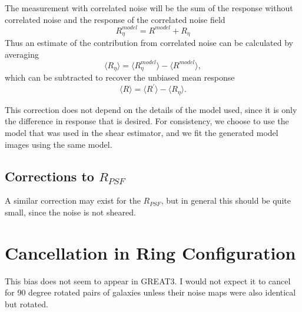 \documentclass[usegraphicx,usenatbib]{mn2e}
\begin{document}
The measurement with correlated noise will be the sum of the response
without correlated noise and the response of the correlated noise field
\begin{equation}
    R^{model}_\eta = R^{model} + R_\eta
\end{equation}
Thus an estimate of the contribution from correlated noise can
be calculated by averaging 
\begin{equation}
    \langle R_\eta \rangle = \langle R^{model}_\eta \rangle - \langle R^{model} \rangle,
\end{equation}
which can be subtracted to recover the unbiased mean response
\begin{equation}
    \langle R \rangle = \langle R^\prime \rangle - \langle R_\eta \rangle.
\end{equation}

This correction does not depend on the details of the model used, since it is
only the difference in response that is desired.  For consistency, we choose to
use the model that was used in the shear estimator, and we fit the generated
model images using the same model.

\subsection{Corrections to $R_{PSF}$}

A similar correction may exist for the $R_{PSF}$, but in general this should
be quite small, since the noise is not sheared.

\section{Cancellation in Ring Configuration}

This bias does not seem to appear in GREAT3.  I would not expect it to cancel
for 90 degree rotated pairs of galaxies unless their noise maps were also
identical but rotated.




\end{document}
